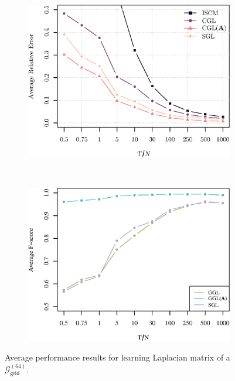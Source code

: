 \begin{figure}[!htb]
    \centering
    \begin{subfigure}[b]{0.47\textwidth}
        \includegraphics[width=\textwidth]{grid/relative_error_grid.eps}
    \end{subfigure}
    ~ %
    \begin{subfigure}[b]{0.47\textwidth}
        \includegraphics[width=\textwidth]{grid/fscore_grid.eps}
    \end{subfigure}
    \caption{Average performance results for learning Laplacian matrix of a $\mathcal{G}^{(64)}_{\mathsf{grid}}$.}
    \label{fig:performance-grid}
\end{figure}

